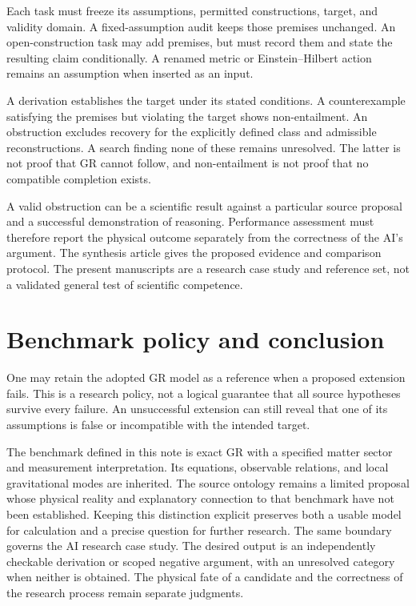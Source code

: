 \documentclass[11pt]{article}
\begin{document}
Each task must freeze its assumptions, permitted constructions, target, and validity domain. A fixed-assumption audit keeps those premises unchanged. An open-construction task may add premises, but must record them and state the resulting claim conditionally. A renamed metric or Einstein--Hilbert action remains an assumption when inserted as an input.

A derivation establishes the target under its stated conditions. A counterexample satisfying the premises but violating the target shows non-entailment. An obstruction excludes recovery for the explicitly defined class and admissible reconstructions. A search finding none of these remains unresolved. The latter is not proof that GR cannot follow, and non-entailment is not proof that no compatible completion exists.

A valid obstruction can be a scientific result against a particular source proposal and a successful demonstration of reasoning. Performance assessment must therefore report the physical outcome separately from the correctness of the AI's argument. The synthesis article gives the proposed evidence and comparison protocol. The present manuscripts are a research case study and reference set, not a validated general test of scientific competence.

\section{Benchmark policy and conclusion}
One may retain the adopted GR model as a reference when a proposed extension fails. This is a research policy, not a logical guarantee that all source hypotheses survive every failure. An unsuccessful extension can still reveal that one of its assumptions is false or incompatible with the intended target.

The benchmark defined in this note is exact GR with a specified matter sector and measurement interpretation. Its equations, observable relations, and local gravitational modes are inherited. The source ontology remains a limited proposal whose physical reality and explanatory connection to that benchmark have not been established. Keeping this distinction explicit preserves both a usable model for calculation and a precise question for further research.
The same boundary governs the AI research case study. The desired output is an independently checkable derivation or scoped negative argument, with an unresolved category when neither is obtained. The physical fate of a candidate and the correctness of the research process remain separate judgments.

\References
\end{document}
